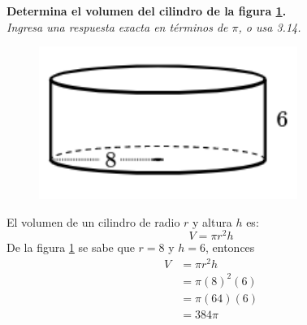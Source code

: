 \textbf{Determina el volumen del cilindro de la figura \ref{fig:vol_cil_04}.}\\
\textit{Ingresa una respuesta exacta en términos de $\pi$, o usa 3.14.}\\

\begin{minipage}[t]{0.3\linewidth}
    \begin{figure}[H]
        \centering
        \includegraphics[width=0.75\textwidth]{../images/vol_cil_04.png}
        \caption{}
        \label{fig:vol_cil_04}
    \end{figure}
\end{minipage}%
\begin{minipage}[t]{0.7\linewidth}
    \begin{solutionbox}{5cm}        El volumen de un cilindro de radio $r$ y altura $h$ es:
        \begin{equation*}
            V = \pi r^2 h
        \end{equation*}
        De la figura \ref{fig:vol_cil_04} se sabe que $r=8$ y $h=6$, entonces
        \begin{equation*}
            \begin{split}
                V & = \pi r^2 h\\
                & = \pi (8)^2 (6)\\
                & = \pi (64) (6)\\
                & = 384\pi
            \end{split}
        \end{equation*}
    \end{solutionbox}
\end{minipage}%